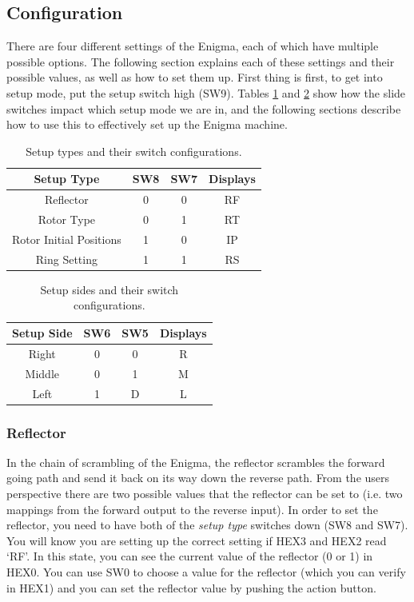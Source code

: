 \documentclass{article}
\begin{document}
\subsection{Configuration} \label{config}
There are four different settings of the Enigma, each of which have multiple possible options. The following section explains each of these settings and their possible values, as well as how to set them up. First thing is first, to get into setup mode, put the setup switch high (SW9). Tables \ref{tab:setup_types} and \ref{tab:setup_sides} show how the slide switches impact which setup mode we are in, and the following sections describe how to use this to effectively set up the Enigma machine.


\begin{table}[ht!]
    \centering
    \begin{tabular}{|c|c|c|c|}
        \hline
        Setup Type & SW8 & SW7 & Displays \\
        \hline \hline
        Reflector & 0 & 0 & RF \\
        \hline
        Rotor Type & 0 & 1 & RT \\
        \hline 
        Rotor Initial Positions & 1 & 0 & IP \\
        \hline
        Ring Setting & 1 & 1 & RS \\
        \hline
    \end{tabular}
    \caption{Setup types and their switch configurations.}
    \label{tab:setup_types}
\end{table}


\begin{table}[ht!]
    \centering
    \begin{tabular}{|c|c|c|c|}
        \hline
        Setup Side & SW6 & SW5 & Displays \\ 
        \hline \hline
        Right & 0 & 0 & R \\
        \hline
        Middle & 0 & 1 & M \\
        \hline
        Left & 1 & D & L \\
        \hline
    \end{tabular}
    \caption{Setup sides and their switch configurations.}
    \label{tab:setup_sides}
\end{table}

\subsubsection{Reflector}
In the chain of scrambling of the Enigma, the reflector scrambles the forward going path and send it back on its way down the reverse path. From the users perspective there are two possible values that the reflector can be set to (i.e. two mappings from the forward output to the reverse input). In order to set the reflector, you need to have both of the \textit{setup type} switches down (SW8 and SW7). You will know you are setting up the correct setting if HEX3 and HEX2 read `RF'. In this state, you can see the current value of the reflector (0 or 1) in HEX0. You can use SW0 to choose a value for the reflector (which you can verify in HEX1) and you can set the reflector value by pushing the action button. 
\end{document}
